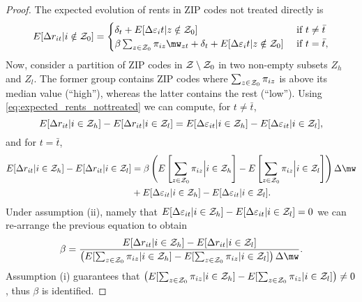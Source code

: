 \begin{proof}
    The expected evolution of rents in ZIP codes not treated directly is
    \begin{equation}\label{eq:expected_rents_nottreated}
        E[\Delta r_{it} | i\notin\Z_0] = 
        \begin{cases}
            \delta_t + E[\Delta \varepsilon_it | z\notin\Z_0] 
                                       & \text{ if } t\neq\bar{t} \\
            \beta\sum_{z\in\Z_0}\pi_{iz}\mw_{zt} + \delta_t 
                     + E[\Delta \varepsilon_it | z\notin\Z_0] 
                                       & \text{ if } t=\bar{t} ,
        \end{cases}
    \end{equation}
    Now, consider a partition of ZIP codes in $\mathcal{Z}\setminus\mathcal{Z}_0$ in two non-empty
    subsets $Z_h$ and $Z_l$.
    The former group contains ZIP codes where $\sum_{z\in\mathcal{Z}_0}\pi_{iz}$ is above 
    its median value (``high''), whereas the latter contains the rest (``low'').
    Using \ref{eq:expected_rents_nottreated} we can compute, for $t\neq \bar{t}$,
    \begin{equation*}
        E[\Delta r_{it} | i\in\mathcal{Z}_h] - E[\Delta r_{it} | i\in\mathcal{Z}_l] = 
        E[\Delta \varepsilon_{it} | i\in\mathcal{Z}_h] - E[\Delta \varepsilon_{it} | i\in\mathcal{Z}_l] ,
    \end{equation*}
    and for $t = \bar{t}$,
    \begin{equation*}
        \begin{split}
            E[\Delta r_{it} | i\in\Z_h] - E[\Delta r_{it} | i\in\Z_l] 
            & = \beta \left(E\left[\sum_{z\in\Z_0}\pi_{iz} \Big| i\in\Z_h\right]
                           - E\left[\sum_{z\in\Z_0}\pi_{iz} \Big| i\in\Z_l\right]\right) \Delta \mw  \\
            & + E[\Delta \varepsilon_{it} | i\in\Z_h] - E[\Delta \varepsilon_{it} | i\in\Z_l] .
        \end{split}
    \end{equation*}
    Under assumption (ii), namely that $E[\Delta \varepsilon_{it} | i\in\mathcal{Z}_h] 
    - E[\Delta \varepsilon_{it} | i\in\mathcal{Z}_l]=0$
    we can re-arrange the previous equation to obtain
    \begin{equation}\label{eq:id_beta}
        \beta = \frac{E[\Delta r_{it} | i\in\Z_h] - E[\Delta r_{it} | i\in\Z_l]}
                     {\left(E[\sum_{z\in\Z_0}\pi_{iz} | i\in\Z_h] - E[\sum_{z\in\Z_0}\pi_{iz} | i\in\Z_l]\right) \Delta \mw}.
    \end{equation}
    Assumption (i) guarantees that $\left(E[\sum_{z\in\mathcal{Z}_0}\pi_{iz} | i\in\mathcal{Z}_h] 
    - E[\sum_{z\in\mathcal{Z}_0}\pi_{iz} | i\in\mathcal{Z}_l]\right) \neq 0$,  
    thus $\beta$ is identified.


\end{proof}

